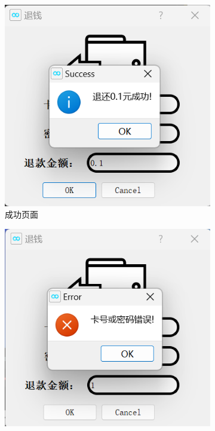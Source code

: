 \documentclass{article}
\begin{document}
    \begin{figure}[htbp]
        \centering
        \begin{subfigure}{0.24\linewidth}
            \centering
            \includegraphics[width=\linewidth]{figure/refund_success.png}
            \caption{成功页面}
            \label{refund_success}
        \end{subfigure}
        \centering
        \begin{subfigure}{0.24\linewidth}
            \centering
            \includegraphics[width=\linewidth]{figure/refund_id_password_error.png}

\end{subfigure}
\end{figure}
\end{document}
